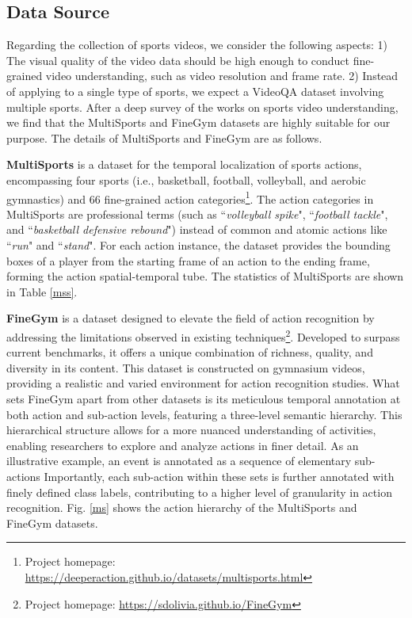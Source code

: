 {\subsection{Data Source}

Regarding the collection of sports videos, we consider the following aspects: 1) The visual quality of the video data should be high enough to conduct fine-grained video understanding, such as video resolution and frame rate. 2) Instead of applying to a single type of sports, we expect a VideoQA dataset involving multiple sports.
After a deep survey of the works on sports video understanding, we find that the MultiSports \citep{li2021multisports} and FineGym \citep{shao2020finegym} datasets are highly suitable for our purpose. The details of MultiSports and FineGym are as follows.


\noindent\textbf{MultiSports} \citep{li2021multisports} is a dataset for the temporal localization of sports actions, encompassing four sports (i.e., basketball, football, volleyball, and aerobic gymnastics) and 66 fine-grained action categories\footnote{Project homepage: \url{https://deeperaction.github.io/datasets/multisports.html}}. The action categories in MultiSports are professional terms (such as ``\textit{volleyball spike}", ``\textit{football tackle}", and ``\textit{basketball defensive rebound}") instead of common and atomic actions like ``\textit{run}" and ``\textit{stand}". For each action instance, the dataset provides the bounding boxes of a player from the starting frame of an action to the ending frame, forming the action spatial-temporal tube. The statistics of MultiSports are shown in Table \ref{mss}.

\noindent\textbf{FineGym} \citep{shao2020finegym} is a dataset designed to elevate the field of action recognition by addressing the limitations observed in existing techniques\footnote{Project homepage: \url{https://sdolivia.github.io/FineGym}}. Developed to surpass current benchmarks, it offers a unique combination of richness, quality, and diversity in its content.
This dataset is constructed on gymnasium videos, providing a realistic and varied environment for action recognition studies. What sets FineGym apart from other datasets is its meticulous temporal annotation at both action and sub-action levels, featuring a three-level semantic hierarchy. This hierarchical structure allows for a more nuanced understanding of activities, enabling researchers to explore and analyze actions in finer detail. As an illustrative example, an event is annotated as a sequence of elementary sub-actions Importantly, each sub-action within these sets is further annotated with finely defined class labels, contributing to a higher level of granularity in action recognition. Fig. \ref{ms} shows the action hierarchy of the MultiSports and FineGym datasets.




}

